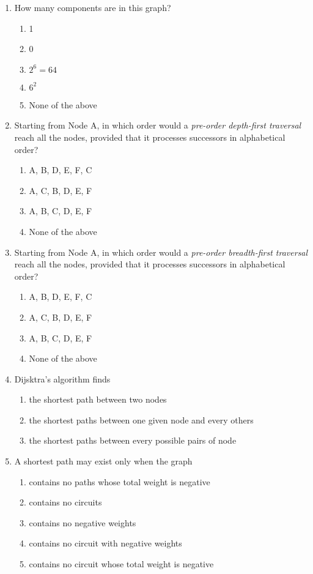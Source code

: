 \documentclass[11pt]{article}
\begin{document}
\begin{enumerate}
\item How many components are in this graph?
\begin{enumerate}
\item 1
\item 0
\item \(2^6 = 64\)
\item \(6^2\)
\item None of the above
\end{enumerate}

\item Starting from Node A, in which order would a \emph{pre-order
depth-first traversal} reach all the nodes, provided that it
processes successors in alphabetical order?
\begin{enumerate}
\item A, B, D, E, F, C
\item A, C, B, D, E, F
\item A, B, C, D, E, F
\item None of the above
\end{enumerate}

\item Starting from Node A, in which order would a \emph{pre-order
breadth-first traversal} reach all the nodes, provided that it
processes successors in alphabetical order?
\begin{enumerate}
\item A, B, D, E, F, C
\item A, C, B, D, E, F
\item A, B, C, D, E, F
\item None of the above
\end{enumerate}

\item Dijsktra's algorithm finds
\begin{enumerate}
\item the shortest path between two nodes
\item the shortest paths between one given node and every others
\item the shortest paths between every possible pairs of node
\end{enumerate}

\item A shortest path may exist only when the graph
\begin{enumerate}
\item contains no paths whose total weight is negative
\item contains no circuits
\item contains no negative weights
\item contains no circuit with negative weights
\item contains no circuit whose total weight is negative
\end{enumerate}


\end{enumerate}
\end{document}
